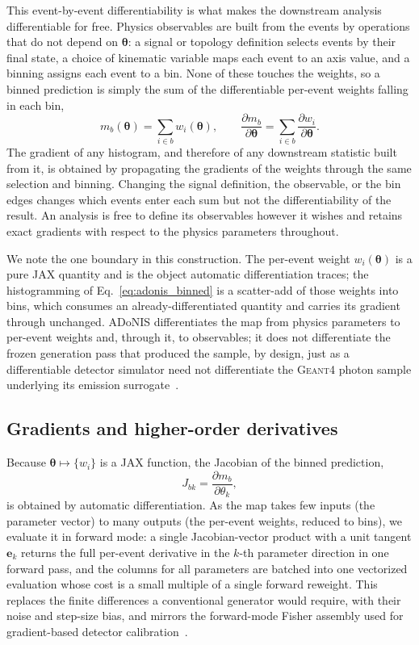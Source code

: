 \documentclass[aps,prd,reprint,superscriptaddress,nofootinbib,amsmath,amssymb,floatfix]{revtex4-1}
\newcommand{\adonis}{{ADoNIS}\xspace}
\begin{document}
This event-by-event differentiability is what makes the downstream analysis
differentiable for free. Physics observables are built from the events by
operations that do not depend on $\bm\theta$: a signal or topology definition
selects events by their final state, a choice of kinematic variable maps each
event to an axis value, and a binning assigns each event to a bin. None of these
touches the weights, so a binned prediction is simply the sum of the differentiable
per-event weights falling in each bin,
\begin{equation}
\label{eq:adonis_binned}
m_b(\bm\theta) = \sum_{i \in b} w_i(\bm\theta),
\qquad
\frac{\partial m_b}{\partial\bm\theta} = \sum_{i \in b}
\frac{\partial w_i}{\partial\bm\theta}.
\end{equation}
The gradient of any histogram, and therefore of any downstream statistic built
from it, is obtained by propagating the gradients of the weights through the same
selection and binning. Changing the signal definition, the observable, or the bin
edges changes which events enter each sum but not the differentiability of the
result. An analysis is free to define its observables however it wishes and
retains exact gradients with respect to the physics parameters throughout.

We note the one boundary in this construction. The per-event weight
$w_i(\bm\theta)$ is a pure JAX quantity and is the object automatic
differentiation traces; the histogramming of Eq.~\ref{eq:adonis_binned} is a
scatter-add of those weights into bins, which consumes an already-differentiated
quantity and carries its gradient through unchanged. \adonis differentiates the
map from physics parameters to per-event weights and, through it, to observables;
it does not differentiate the frozen generation pass that produced the sample, by
design, just as a differentiable detector simulator need not differentiate the
\textsc{Geant4} photon sample underlying its emission surrogate~\cite{LUCiD}.

\subsection{Gradients and higher-order derivatives}
\label{sec:adonis_gradients}

Because $\bm\theta \mapsto \{w_i\}$ is a JAX function, the Jacobian of the binned
prediction,
\begin{equation}
J_{bk} = \frac{\partial m_b}{\partial\theta_k},
\end{equation}
is obtained by automatic differentiation. As the map takes few inputs (the
parameter vector) to many outputs (the per-event weights, reduced to bins), we
evaluate it in forward mode: a single Jacobian-vector product with a unit tangent
$\mathbf{e}_k$ returns the full per-event derivative in the $k$-th parameter
direction in one forward pass, and the columns for all parameters are batched into
one vectorized evaluation whose cost is a small multiple of a single forward
reweight. This replaces the finite differences a conventional generator would
require, with their noise and step-size bias, and mirrors the forward-mode Fisher
assembly used for gradient-based detector calibration~\cite{LUCiD}.
\end{document}
